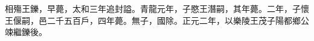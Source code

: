 \begin{pinyinscope}
 
 
 相殤王鑠，早薨，太和三年追封謚。青龍元年，子愍王潛嗣，其年薨。二年，子懷王偃嗣，邑二千五百戶，四年薨。無子，國除。正元二年，以樂陵王茂子陽都鄉公竦繼鑠後。
 
 
\end{pinyinscope}